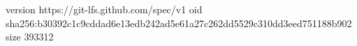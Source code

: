 version https://git-lfs.github.com/spec/v1
oid sha256:b30392c1c9cddad6e13edb242ad5e61a27c262dd5529c310dd3eed751188b902
size 393312
